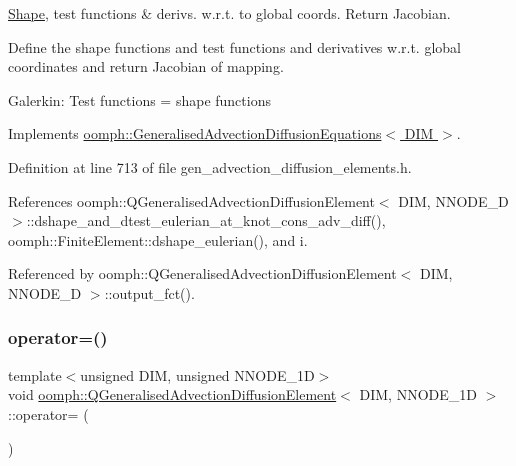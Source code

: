 \hyperlink{classoomph_1_1Shape}{Shape}, test functions \& derivs. w.\+r.\+t. to global coords. Return Jacobian. 

Define the shape functions and test functions and derivatives w.\+r.\+t. global coordinates and return Jacobian of mapping.

Galerkin\+: Test functions = shape functions 

Implements \hyperlink{classoomph_1_1GeneralisedAdvectionDiffusionEquations_a7d1b7d414a32173038a7b31b65ff5e8a}{oomph\+::\+Generalised\+Advection\+Diffusion\+Equations$<$ D\+I\+M $>$}.



Definition at line 713 of file gen\+\_\+advection\+\_\+diffusion\+\_\+elements.\+h.



References oomph\+::\+Q\+Generalised\+Advection\+Diffusion\+Element$<$ D\+I\+M, N\+N\+O\+D\+E\+\_\+D $>$\+::dshape\+\_\+and\+\_\+dtest\+\_\+eulerian\+\_\+at\+\_\+knot\+\_\+cons\+\_\+adv\+\_\+diff(), oomph\+::\+Finite\+Element\+::dshape\+\_\+eulerian(), and i.



Referenced by oomph\+::\+Q\+Generalised\+Advection\+Diffusion\+Element$<$ D\+I\+M, N\+N\+O\+D\+E\+\_\+D $>$\+::output\+\_\+fct().

\mbox{\label{classoomph_1_1QGeneralisedAdvectionDiffusionElement_a6bbdccb49534c23105b563343fb3c78c}} 
\subsubsection{\texorpdfstring{operator=()}{operator=()}}
{\footnotesize\ttfamily template$<$unsigned D\+IM, unsigned N\+N\+O\+D\+E\+\_\+1D$>$ \\
void \hyperlink{classoomph_1_1QGeneralisedAdvectionDiffusionElement}{oomph\+::\+Q\+Generalised\+Advection\+Diffusion\+Element}$<$ D\+IM, N\+N\+O\+D\+E\+\_\+1D $>$\+::operator= (\begin{DoxyParamCaption}\item[{const \hyperlink{classoomph_1_1QGeneralisedAdvectionDiffusionElement}{Q\+Generalised\+Advection\+Diffusion\+Element}$<$ D\+IM, N\+N\+O\+D\+E\+\_\+1D $>$ \&}]{ }\end{DoxyParamCaption})\hspace{0.3cm}{\ttfamily [inline]}}



